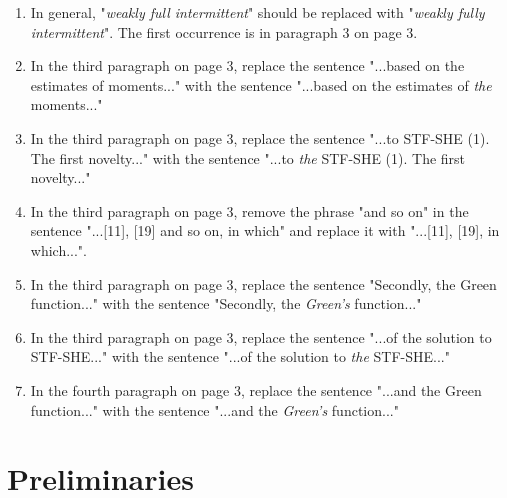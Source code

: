 \documentclass[a4paper,11pt]{article}
\numberwithin{equation}{section}
\numberwithin{equation}{section}
\theoremstyle{plain}
\theoremstyle{definition}
\begin{document}
\begin{enumerate}
	\item
In general, "\textit{weakly full intermittent}" should be replaced with "\textit{weakly fully intermittent}". The first occurrence is in paragraph 3 on page 3. 

	\item 
In the third paragraph on page 3, replace the sentence "...based on the estimates of moments..." with the sentence "...based on the estimates of \textit{the} moments..." 

	\item 
In the third paragraph on page 3, replace the sentence "...to STF-SHE (1). The first novelty..." with the sentence  "...to \textit{the} STF-SHE (1). The first novelty..."

	\item
In the third paragraph on page 3, remove the phrase "and so on" in the sentence "...[11], [19] and so on, in which" and replace it with "...[11], [19], in which...".

	\item 
In the third paragraph on page 3, replace the sentence "Secondly, the Green function..." with the sentence "Secondly, the \textit{Green's} function..."

	\item 
In the third paragraph on page 3, replace the sentence "...of the solution to STF-SHE..." with the sentence  "...of the solution to \textit{the} STF-SHE..."

	\item
In the fourth paragraph on page 3, replace the sentence "...and the Green function..." with the sentence  "...and the \textit{Green's} function..."
\end{enumerate}
		
\section{Preliminaries}
\end{document}
